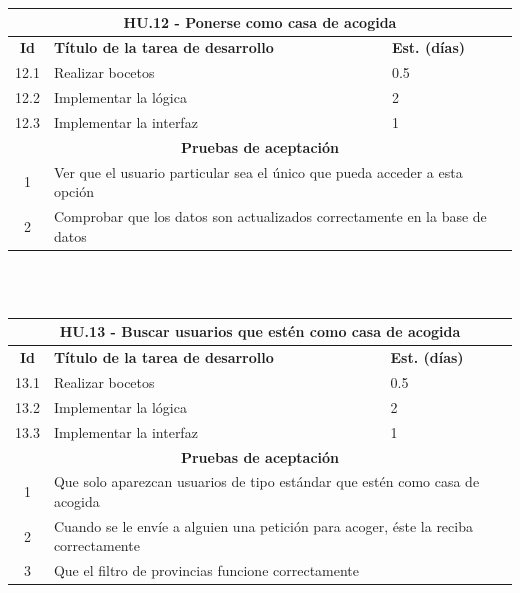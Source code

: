 \begin{tabular}{|c|p{9.5cm}|p{1cm}|}
	\hline
	\multicolumn{3}{|c|}{\textbf{HU.12 - Ponerse como casa de acogida}} \\
	\hline
	\textbf{Id} & \textbf{Título de la tarea de desarrollo} & \textbf{Est. (días)} \\
	\hline
	12.1 & Realizar bocetos & 0.5 \\ \hline
	12.2 &  Implementar la lógica & 2 \\ \hline
	12.3 &  Implementar la interfaz & 1 \\ \hline
	\multicolumn{3}{|c|}{\textbf{Pruebas de aceptación}} \\ \hline
	1 & \multicolumn{2}{|p{10cm}|}{Ver que el usuario particular sea el único que pueda acceder a esta opción} \\ \hline
	2 & \multicolumn{2}{|p{10cm}|}{Comprobar que los datos son actualizados correctamente en la base de datos} \\ \hline
	
\end{tabular} \\ \\

\begin{tabular}{|c|p{9.5cm}|p{1cm}|}
	\hline
	\multicolumn{3}{|c|}{\textbf{HU.13 - Buscar usuarios que estén como casa de acogida}} \\
	\hline
	\textbf{Id} & \textbf{Título de la tarea de desarrollo} & \textbf{Est. (días)} \\
	\hline
	13.1 & Realizar bocetos & 0.5 \\ \hline
	13.2 &  Implementar la lógica & 2 \\ \hline
	13.3 &  Implementar la interfaz & 1 \\ \hline
	\multicolumn{3}{|c|}{\textbf{Pruebas de aceptación}} \\ \hline
	1 & \multicolumn{2}{|p{12cm}|}{Que solo aparezcan usuarios de tipo estándar que estén como casa de acogida} \\ \hline
	2 & \multicolumn{2}{|p{12cm}|}{Cuando se le envíe a alguien una petición para acoger, éste la reciba correctamente} \\ \hline
	3 & \multicolumn{2}{|p{12cm}|}{Que el filtro de provincias funcione correctamente} \\ \hline
	
\end{tabular} \\ \\

